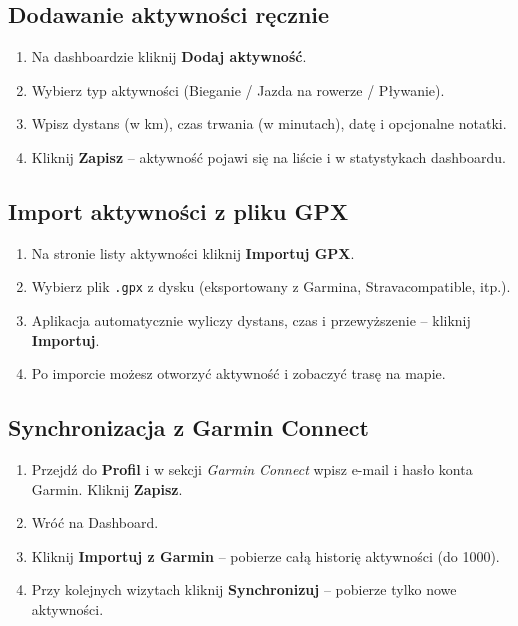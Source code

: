 \documentclass[12pt,a4paper]{report}
\begin{document}
\subsection{Dodawanie aktywności ręcznie}

\begin{enumerate}[noitemsep]
    \item Na dashboardzie kliknij \textbf{Dodaj aktywność}.
    \item Wybierz typ aktywności (Bieganie / Jazda na rowerze / Pływanie).
    \item Wpisz dystans (w km), czas trwania (w minutach), datę i opcjonalne notatki.
    \item Kliknij \textbf{Zapisz} -- aktywność pojawi się na liście i w statystykach dashboardu.
\end{enumerate}

\subsection{Import aktywności z pliku GPX}

\begin{enumerate}[noitemsep]
    \item Na stronie listy aktywności kliknij \textbf{Importuj GPX}.
    \item Wybierz plik \texttt{.gpx} z dysku (eksportowany z Garmina, Stravacompatible, itp.).
    \item Aplikacja automatycznie wyliczy dystans, czas i przewyższenie -- kliknij \textbf{Importuj}.
    \item Po imporcie możesz otworzyć aktywność i zobaczyć trasę na mapie.
\end{enumerate}

\subsection{Synchronizacja z Garmin Connect}

\begin{enumerate}[noitemsep]
    \item Przejdź do \textbf{Profil} i w sekcji \textit{Garmin Connect} wpisz e-mail i hasło konta Garmin. Kliknij \textbf{Zapisz}.
    \item Wróć na Dashboard.
    \item Kliknij \textbf{Importuj z Garmin} -- pobierze całą historię aktywności (do 1000).
    \item Przy kolejnych wizytach kliknij \textbf{Synchronizuj} -- pobierze tylko nowe aktywności.
\end{enumerate}
\end{document}
